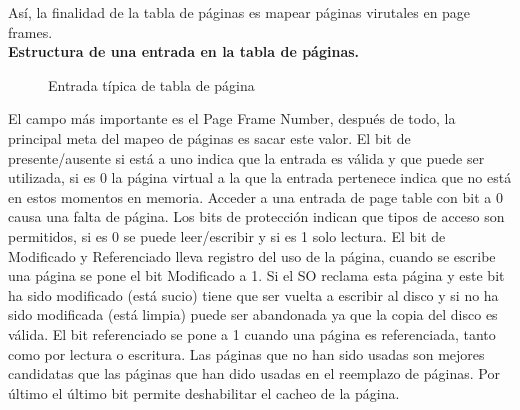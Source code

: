 \documentclass[10pt,portrait, twocolumn]{article}
\begin{document}
Así, la finalidad de la tabla de páginas es mapear páginas virutales en page frames. \\

\textbf{Estructura de una entrada en la tabla de páginas.}

\begin{figure}[h]
	\centering
      \caption{Entrada típica de tabla de página}
  \end{figure}

El campo más importante es el Page Frame Number, después de todo, la principal meta del mapeo de páginas es sacar este valor. El bit de presente/ausente si está a uno indica que la entrada es válida y que puede ser utilizada, si es 0 la página virtual a la que la entrada pertenece indica que no está en estos momentos en memoria. Acceder a una entrada de page table con bit a 0 causa una falta de página. Los bits de protección indican que tipos de acceso son permitidos, si es 0 se puede leer/escribir y si es 1 solo lectura. El bit de Modificado y Referenciado lleva registro del uso de la página, cuando se escribe una página se pone el bit Modificado a 1. Si el SO reclama esta página y este bit ha sido modificado (está sucio) tiene que ser vuelta a escribir al disco y si no ha sido modificada (está limpia) puede ser abandonada ya que la copia del disco es válida. El bit referenciado se pone a 1 cuando una página es referenciada, tanto como por lectura o escritura. Las páginas que no han sido usadas son mejores candidatas que las páginas que han dido usadas en el reemplazo de páginas. Por último el último bit permite deshabilitar el cacheo de la página.
\end{document}
